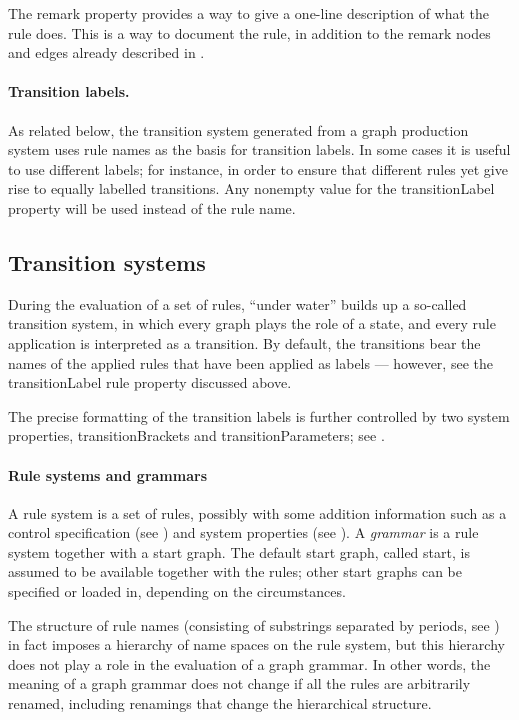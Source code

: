 The \textsf{remark} property provides a way to give a one-line description of
what the rule does. This is a way to document the rule, in addition to the
remark nodes and edges already described in .

\paragraph{Transition labels.}

As related below, the transition system generated from a graph production
system uses rule names as the basis for transition labels. In some cases it is
useful to use different labels; for instance, in order to ensure that different
rules yet give rise to equally labelled transitions. Any nonempty value for the
\textsf{transitionLabel} property will be used instead of the rule name.

\subsection{Transition systems}

During the evaluation of a set of rules, \GROOVE{} ``under water'' builds up a
so-called transition system, in which every graph plays the role of a state,
and every rule application is interpreted as a transition. By default, the
transitions bear the names of the applied rules that have been applied as
labels --- however, see the \textsf{transitionLabel} rule property discussed
above.

The precise formatting of the transition labels is further controlled by two
system properties, \textsf{transitionBrackets} and
\textsf{transitionParameters}; see .

\paragraph{Rule systems and grammars}

A rule system is a set of rules, possibly with some addition information such
as a control specification (see ) and system properties (see
). A \emph{grammar} is a rule system together with a
start graph. The default start graph, called \textsf{start}, is assumed to be
available together with the rules; other start graphs can be specified or
loaded in, depending on the circumstances.

The structure of rule names (consisting of substrings separated by periods, see
) in fact imposes a hierarchy of name spaces on the rule system,
but this hierarchy does not play a role in the evaluation of a graph grammar.
In other words, the meaning of a graph grammar does not change if all the rules
are arbitrarily renamed, including renamings that change the hierarchical
structure.

